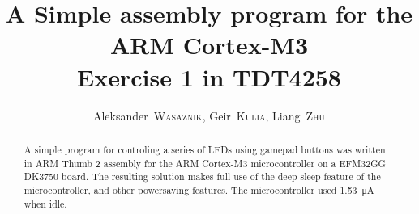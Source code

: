 \documentclass[a4,journal,twoside]{IEEEtran}
\title{
    A Simple assembly program for the ARM Cortex-M3\\
    Exercise 1 in TDT4258
}
\author{
    Aleksander~\textsc{Wasaznik},
    Geir~\textsc{Kulia},
    Liang~\textsc{Zhu}
}
\begin{document}
\maketitle

\begin{abstract}
    A simple program for controling a series of LEDs using gamepad buttons was written in ARM Thumb 2 assembly for the ARM Cortex-M3 microcontroller on a EFM32GG DK3750 board.
    The resulting solution makes full use of the deep sleep feature of the microcontroller, and other powersaving features.
    The microcontroller used \SI{1.53}{\micro\ampere} when idle.
\end{abstract}



\end{document}
